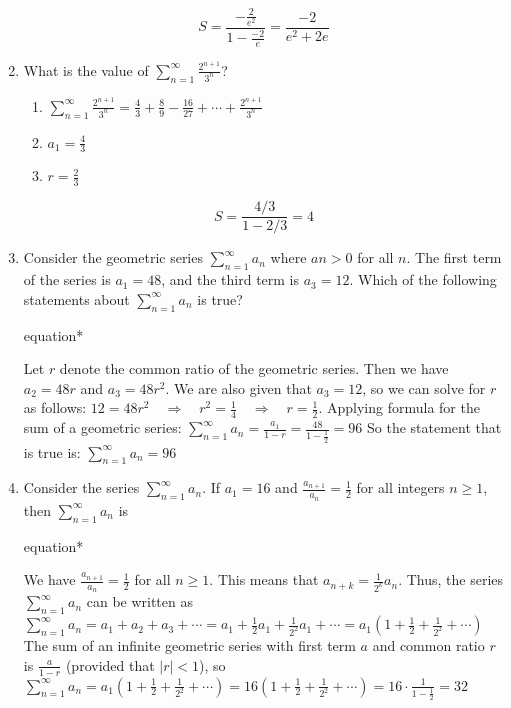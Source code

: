 \documentclass[12pt]{article}
\begin{document}
\begin{enumerate}
\begin{enumerate}
		\end{enumerate}
		$$S = \frac{-\frac{2}{e^2}}{1-\frac{-2}{e}} =\boxed{\frac{-2}{e^2+2e}}$$
	\item What is the value of $\sum_{n=1}^{\infty} \frac{2^{n+1}}{3^n}$?
	\begin{enumerate}
		\item $\sum_{n=1}^{\infty} \frac{2^{n+1}}{3^n} = \frac{4}{3} + \frac{8}{9} - \frac{16}{27}  + \cdots + \frac{2^{n+1}}{3^n}$
		\item $a_1 = \frac{4}{3}$
		\item $r= \frac{2}{3}$
	\end{enumerate}
	$$S = \frac{4/3}{1 - 2/3} =\boxed{4}$$
	\item Consider the geometric series $\sum_{n=1}^{\infty}a_n$ where $an > 0$ for all $n$. The first term of the series is $a_1 = 48$, and the third term is $a_3 = 12$. Which of the following statements about $\sum_{n=1}^{\infty}a_n$ is true?
	\begin{empheq}[box=\tcbhighmath]{equation*}
		\parbox{6in}{Let $r$ denote the common ratio of the geometric series. Then we have $a_2 = 48r$ and $a_3 = 48r^2$. We are also given that $a_3 = 12$, so we can solve for $r$ as follows: $12 = 48r^2 \quad \Rightarrow \quad r^2 = \frac{1}{4} \quad \Rightarrow \quad r = \frac{1}{2}$. Applying formula for the sum of a geometric series: $\sum_{n=1}^{\infty} a_n = \frac{a_1}{1-r} = \frac{48}{1-\frac{1}{2}} = 96$ So the statement that is true is: $\boxed{\sum_{n=1}^{\infty} a_n = 96}$}
	\end{empheq}

	\item Consider the series $\sum_{n=1}^{\infty}a_n$. If $a_1 = 16$ and $\frac{a_{n+1}}{a_n} = \frac{1}{2}$ for all integers $n\geq 1$, then $\sum_{n=1}^{\infty}a_n$ is
		\begin{empheq}[box=\tcbhighmath]{equation*}
			\parbox{6in}{We have $\frac{a_{n+1}}{a_n} = \frac{1}{2}$ for all $n\geq 1$. This means that $a_{n+k} = \frac{1}{2^k}a_n$. Thus, the series $\sum_{n=1}^{\infty}a_n$ can be written as $\sum_{n=1}^{\infty}a_n = a_1 + a_2 + a_3 + \cdots = a_1 + \frac{1}{2}a_1 + \frac{1}{2^2}a_1 + \cdots = a_1\left(1+\frac{1}{2}+\frac{1}{2^2}+\cdots\right)$ The sum of an infinite geometric series with first term $a$ and common ratio $r$ is $\frac{a}{1-r}$ (provided that $|r|<1$), so $\sum_{n=1}^{\infty}a_n = a_1\left(1+\frac{1}{2}+\frac{1}{2^2}+\cdots\right) = 16\left(1+\frac{1}{2}+\frac{1}{2^2}+\cdots\right) = 16\cdot\frac{1}{1-\frac{1}{2}} = \boxed{32}$}
		\end{empheq}


\end{enumerate}
\end{document}
